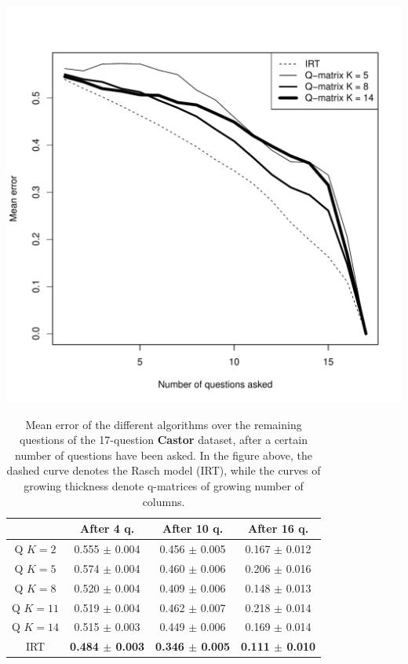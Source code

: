 \documentclass{edm_template}
\begin{document}
\begin{table}[h]
\includegraphics[width=\linewidth]{castor.pdf}
\small\centering\begin{tabular}{@{}c|ccc@{}}
& After 4 q. & After 10 q. & After 16 q.\\
\hline
Q $K = 2$ & 0.555 $\pm$ 0.004 & 0.456 $\pm$ 0.005 & 0.167 $\pm$ 0.012 \\
Q $K = 5$ & 0.574 $\pm$ 0.004 & 0.460 $\pm$ 0.006 & 0.206 $\pm$ 0.016 \\
Q $K = 8$ & 0.520 $\pm$ 0.004 & 0.409 $\pm$ 0.006 & 0.148 $\pm$ 0.013 \\
Q $K = 11$ & 0.519 $\pm$ 0.004 & 0.462 $\pm$ 0.007 & 0.218 $\pm$ 0.014 \\
Q $K = 14$ & 0.515 $\pm$ 0.003 & 0.449 $\pm$ 0.006 & 0.169 $\pm$ 0.014 \\
IRT & \textbf{0.484 $\pm$ \textbf0.003} & \textbf{0.346 $\pm$ 0.005} & \textbf{0.111 $\pm$ 0.010} \\
\end{tabular}
\caption{Mean error of the different algorithms over the remaining questions of the 17-question \textbf{Castor} dataset, after a certain number of questions have been asked. In the figure above, the dashed curve denotes the Rasch model (IRT), while the curves of growing thickness denote q-matrices of growing number of columns.\vspace{-5mm}}
\label{tab:castor}
\end{table}
\end{document}
